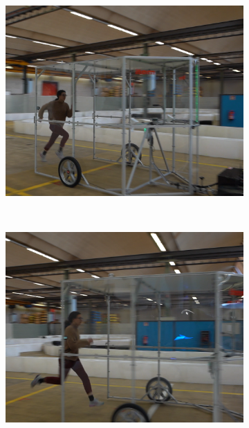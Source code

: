 \documentclass[a4paper,12pt,oneside]{book}
\begin{document}
\begin{figure}
\begin{subfigure}[b]{0.32\textwidth}
        \includegraphics[width=\textwidth]{SteadyState/ss3.png}
    \end{subfigure}
    \\[0.2cm]
    \begin{subfigure}[b]{0.32\textwidth}
        \includegraphics[width=\textwidth]{SteadyState/ss4.png}
    \end{subfigure}
    \hfill
    \begin{subfigure}[b]{0.32\textwidth}

\end{subfigure}
\end{figure}
\end{document}
